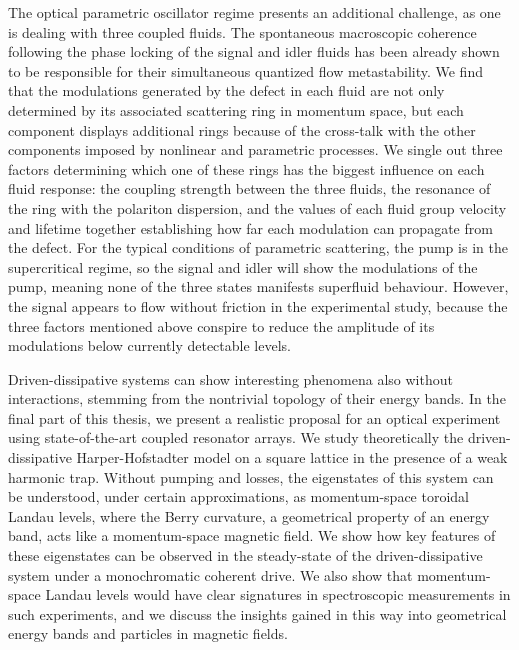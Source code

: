 The optical parametric oscillator regime presents an additional
challenge, as one is dealing with three coupled fluids. The
spontaneous macroscopic coherence following the phase locking of the
signal and idler fluids has been already shown to be responsible for
their simultaneous quantized flow metastability. We find that the
modulations generated by the defect in each fluid are not only
determined by its associated scattering ring in momentum space, but
each component displays additional rings because of the cross-talk
with the other components imposed by nonlinear and parametric
processes. We single out three factors determining which one of these
rings has the biggest influence on each fluid response: the coupling
strength between the three fluids, the resonance of the ring with the
polariton dispersion, and the values of each fluid group velocity and
lifetime together establishing how far each modulation can propagate
from the defect.  For the typical conditions of parametric scattering,
the pump is in the supercritical regime, so the signal and idler will
show the modulations of the pump, meaning none of the three states
manifests superfluid behaviour. However, the signal appears to flow
without friction in the experimental study, because the three factors
mentioned above conspire to reduce the amplitude of its modulations
below currently detectable levels.

Driven-dissipative systems can show interesting phenomena also without
interactions, stemming from the nontrivial topology of their energy
bands. In the final part of this thesis, we present a realistic
proposal for an optical experiment using state-of-the-art coupled
resonator arrays. We study theoretically the driven-dissipative
Harper-Hofstadter model on a square lattice in the presence of a weak
harmonic trap. Without pumping and losses, the eigenstates of this
system can be understood, under certain approximations, as
momentum-space toroidal Landau levels, where the Berry curvature, a
geometrical property of an energy band, acts like a momentum-space
magnetic field. We show how key features of these eigenstates can be
observed in the steady-state of the driven-dissipative system under a
monochromatic coherent drive. We also show that momentum-space Landau
levels would have clear signatures in spectroscopic measurements in
such experiments, and we discuss the insights gained in this way into
geometrical energy bands and particles in magnetic fields.


